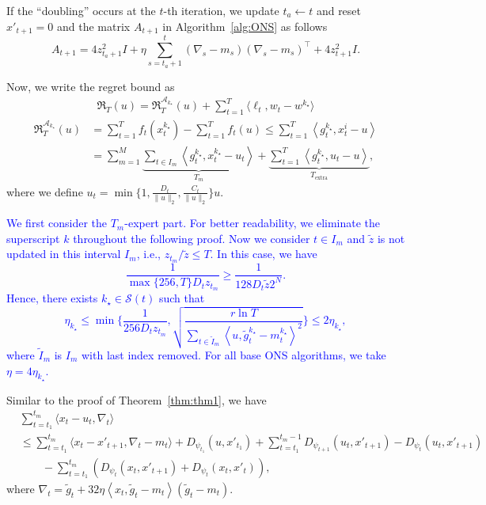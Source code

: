 \documentclass{article}
\theoremstyle{plain}
\theoremstyle{definition}
\theoremstyle{remark}
\newcommand{\cA}{\mathcal{A}}
\newcommand{\cS}{\mathcal{S}}
\newcommand{\bcomment}[1]{\textcolor{blue}{#1}}
\newcommand{\regret}{\mathfrak{R}}
\newcommand{\inner}[2]{\left\langle #1, #2 \right\rangle}
\renewcommand{\tilde}{\widetilde}
\begin{document}
If the ``doubling'' occurs at the $t$-th iteration, we update $t_a\leftarrow t$ and reset $x'_{t+1}=0$ and the matrix $A_{t+1}$ in Algorithm~\ref{alg:ONS} as follows
\begin{equation}\label{eq:updatedAtfree}
A_{t+1} = 4z_{t_a+1}^2 I \!+\eta \sum_{s=t_a+1}^{t} (\nabla_s - m_s)(\nabla_s - m_s)^\top + 4z_{t+1}^2 I.
\end{equation}

Now, we write the regret bound as
\begin{align*}
\regret_T(u)=\regret_T^{\cA_{k_\star}}(u)+\sum_{t=1}^T\langle \ell_t, w_t-w^{k_\star}\rangle
\end{align*}
\begin{align}
\regret_T^{\cA_{k_\star}}(u)&=\sum_{t=1}^T f_t(x_t^{k_\star}) - \sum_{t=1}^T f_t(u) \leq \sum_{t=1}^T \inner{g_t^{k_\star}}{x_t^i - u}\nonumber \\
&= \sum_{m=1}^M \underbrace{\sum_{t \in I_m} \inner{g_t^{k_\star}}{x_t^{k_\star} - u_t}}_{T_m} + \underbrace{\sum_{t =1}^T \inner{g_t^{k_\star}}{u_t - u}}_{T_{\text{extra}}},
\end{align}
where we define $u_t = \min\{ 1, \frac{D_t}{\| u \|_2},  \frac{C_t}{\| u \|_2} \} u$.

\bcomment{
We first consider the $T_m$-expert part.  For better readability, we eliminate the superscript $k$ throughout the following proof. Now we consider $t\in I_m$ and $\tilde{z}$ is not updated in this interval $I_m$, i.e., $z_{t_m}/\tilde{z}\leq T$. In this case, we have
\begin{equation*}
\frac{1}{\max\{256,T\}D_t z_{t_m}}\geq \frac{1}{128D_t\tilde{z}2^N}.
\end{equation*}
Hence, there exists $k_\star\in \cS(t)$ such that
\begin{equation*}
\eta_{k_\star} \leq \min\Big\{\frac{1}{256D_t z_{t_m}},\sqrt{\frac{r\ln T}{\sum_{t\in \tilde{I}_m}\inner{u}{\tilde{g}_t^{k_\star}-m_t^{k_\star}}^2}}\Big\}\leq 2\eta_{k_\star},
\end{equation*}
where $\tilde{I}_m$ is $I_m$ with last index removed.
For all base ONS algorithms, we take $\eta=4\eta_{k_\star}$.
}


Similar to the proof of Theorem~\ref{thm:thm1}, we have
\begin{align*}
&\sum_{t=t_1}^{t_m} \langle x_t-u_t,\nabla_t\rangle\\
&\leq \sum_{t=t_1}^{t_m} \langle x_{t}-x'_{t+1},\nabla_t-m_t\rangle+D_{\psi_{t_1}}(u,x'_{t_1})+\sum_{t=t_1}^{t_m-1}D_{\psi_{t+1}}(u_t,x'_{t+1})-D_{\psi_t}(u_t,x'_{t+1})\\
&\qquad-\sum_{t=t_1}^{t_m}(D_{\psi_t}(x_t,x'_{t+1})+D_{\psi_t}(x_t,x'_{t})),
\end{align*}
where $\nabla_t=\tilde{g}_t + 32\eta\inner{x_t}{\tilde{g}_t-m_t}(\tilde{g}_t-m_t)$.
\end{document}
